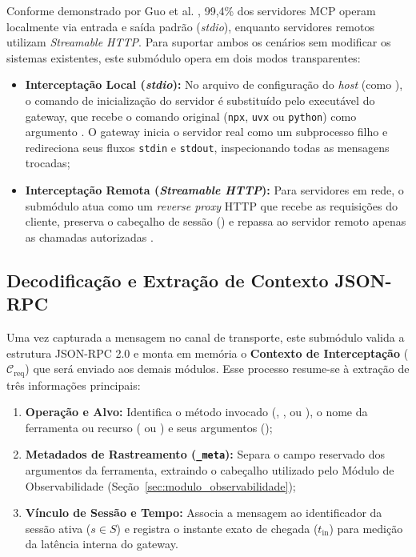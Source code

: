 Conforme demonstrado por Guo et al. \cite{guo2025measurement}, 99,4\% dos servidores MCP operam localmente via entrada e saída padrão (\textit{stdio}), enquanto servidores remotos utilizam \textit{Streamable HTTP}. Para suportar ambos os cenários sem modificar os sistemas existentes, este submódulo opera em dois modos transparentes:
\begin{itemize}
  \item \textbf{Interceptação Local (\textit{stdio}):} No arquivo de configuração do \textit{host} (como ), o comando de inicialização do servidor é substituído pelo executável do gateway, que recebe o comando original (\texttt{npx}, \texttt{uvx} ou \texttt{python}) como argumento \cite{hou2025mcp,buhler2026agentbound}. O gateway inicia o servidor real como um subprocesso filho e redireciona seus fluxos \texttt{stdin} e \texttt{stdout}, inspecionando todas as mensagens trocadas;
  \item \textbf{Interceptação Remota (\textit{Streamable HTTP}):} Para servidores em rede, o submódulo atua como um \textit{reverse proxy} HTTP que recebe as requisições do cliente, preserva o cabeçalho de sessão () e repassa ao servidor remoto apenas as chamadas autorizadas \cite{singh2026mcpsecure}.
\end{itemize}

\subsection{Decodificação e Extração de Contexto JSON-RPC}
\label{subsec:normalizador_jsonrpc}

Uma vez capturada a mensagem no canal de transporte, este submódulo valida a estrutura JSON-RPC 2.0 e monta em memória o \textbf{Contexto de Interceptação} ($\mathcal{C}_{\text{req}}$) que será enviado aos demais módulos. Esse processo resume-se à extração de três informações principais:
\begin{enumerate}
  \item \textbf{Operação e Alvo:} Identifica o método invocado (, ,  ou ), o nome da ferramenta ou recurso ( ou ) e seus argumentos ();
  \item \textbf{Metadados de Rastreamento (\texttt{\_meta}):} Separa o campo reservado  dos argumentos da ferramenta, extraindo o cabeçalho  utilizado pelo Módulo de Observabilidade (Seção~\ref{sec:modulo_observabilidade});
  \item \textbf{Vínculo de Sessão e Tempo:} Associa a mensagem ao identificador da sessão ativa ($s \in S$) e registra o instante exato de chegada ($t_{\text{in}}$) para medição da latência interna do gateway.
\end{enumerate}

